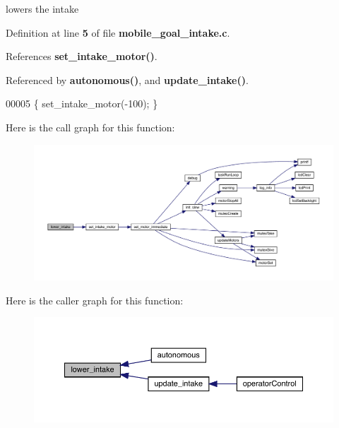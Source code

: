 lowers the intake 



Definition at line \textbf{ 5} of file \textbf{ mobile\+\_\+goal\+\_\+intake.\+c}.



References \textbf{ set\+\_\+intake\+\_\+motor()}.



Referenced by \textbf{ autonomous()}, and \textbf{ update\+\_\+intake()}.


\begin{DoxyCode}
00005 \{ set_intake_motor(-100); \}
\end{DoxyCode}
Here is the call graph for this function\+:
\nopagebreak
\begin{figure}[H]
\begin{center}
\leavevmode
\includegraphics[width=350pt]{mobile__goal__intake_8c_aef03134014e51a6a90dd3824f09f4d6c_cgraph}
\end{center}
\end{figure}
Here is the caller graph for this function\+:
\nopagebreak
\begin{figure}[H]
\begin{center}
\leavevmode
\includegraphics[width=350pt]{mobile__goal__intake_8c_aef03134014e51a6a90dd3824f09f4d6c_icgraph}
\end{center}
\end{figure}
\mbox{\label{mobile__goal__intake_8c_aa46a9341d1eb7b39a2ef4cc5079ee3ca}} 
